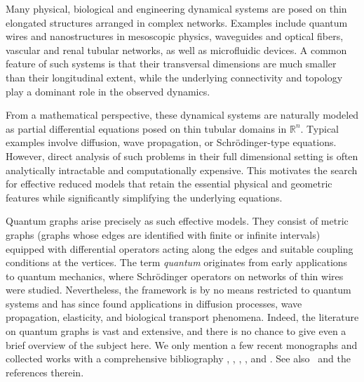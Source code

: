 \documentclass[reqno,12pt]{amsart}
\numberwithin{equation}{section} %
\begin{document}
Many physical, biological and engineering  dynamical systems are posed on  thin  elongated structures arranged in complex networks. Examples include quantum wires and nanostructures in mesoscopic physics, waveguides and optical fibers, vascular and renal tubular networks, as well as microfluidic devices.  A common feature of such systems is that their transversal dimensions are much smaller than their longitudinal extent,   while the underlying connectivity and topology play a dominant role in the observed dynamics.

From a mathematical perspective, these  dynamical systems are naturally modeled as partial differential equations posed on thin tubular domains in $\mathbb{R}^n$.   Typical examples involve diffusion, wave propagation, or Schrödinger-type equations.   However, direct analysis of such problems in their full dimensional setting is often analytically intractable and computationally expensive. This motivates the search for effective reduced models that retain the essential physical and geometric features while significantly simplifying the underlying equations. 



Quantum graphs arise precisely as such effective models. They consist of metric graphs (graphs whose edges are identified with finite or infinite intervals) equipped with differential operators acting along the edges and suitable coupling conditions at the vertices. The term {\it quantum} originates from early applications to quantum mechanics, where Schrödinger operators on networks of thin wires were studied. Nevertheless, the framework is by no means restricted to quantum systems and has since found applications in diffusion processes, wave propagation, elasticity, and biological transport phenomena.  Indeed, the literature on quantum graphs is vast and extensive, and there is no chance to give even a brief overview of the subject here.
We only mention a few recent monographs and collected works with a comprehensive bibliography \cite{BerCarFul06}, \cite{BerKuc13}, \cite{ExnKeaKuc08}, \cite{KosSch06}, \cite{Mug14} and \cite{Pos09b}.  See also~\cite{Scotel} and the references therein.
 
\end{document}
